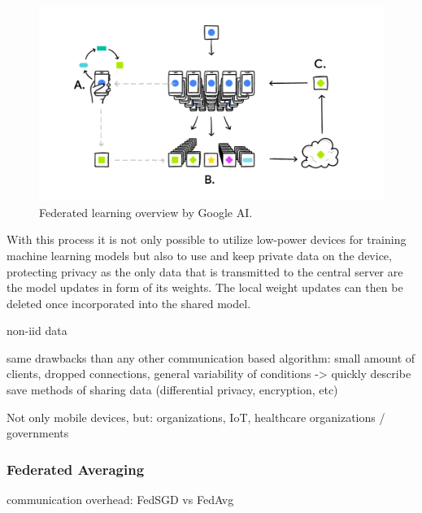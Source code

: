 \begin{figure}
    \centering
    \includegraphics[width=1.0\linewidth]{imgs/FederatedLearning_googleai.png}
    \caption{Federated learning overview by Google AI.\cite{google_ai_federated_learning}}
    \label{fig:google_ai_fl}
\end{figure}

With this process it is not only possible to utilize low-power devices for training machine learning models but also to use and keep private data on the device, protecting privacy as the only data that is transmitted to the central server are the model updates in form of its weights. The local weight updates can then be deleted once incorporated into the shared model.

non-iid data

same drawbacks than any other communication based algorithm: small amount of clients, dropped connections, general variability of conditions 
-> quickly describe save methods of sharing data (differential privacy, encryption, etc)

Not only mobile devices, but: organizations, IoT, healthcare organizations / governments

\subsubsection{Federated Averaging}
communication overhead:
FedSGD vs FedAvg


